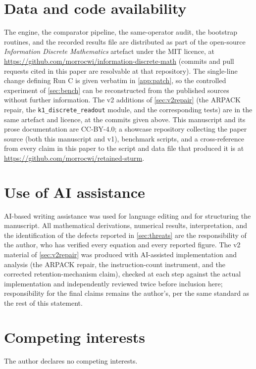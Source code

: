 \documentclass[twocolumn,10pt,a4paper]{article}
\theoremstyle{plain}
\theoremstyle{definition}
\begin{document}
\section*{Data and code availability}
\begin{sloppypar}
The engine, the comparator pipeline, the same-operator
audit, the bootstrap routines, and the recorded
results file are distributed as part of the open-source
\emph{Information Discrete Mathematics} artefact under
the MIT licence, at
\url{https://github.com/morrocwi/information-discrete-math} (commits and
pull requests cited in this paper are resolvable at that repository). The
single-line change defining Run C is given verbatim in
\cref{app:patch}, so the controlled experiment of \cref{sec:bench} can be
reconstructed from the published sources without further information. The
v2 additions of \cref{sec:v2repair} (the ARPACK repair, the
\texttt{k1\_discrete\_readout} module, and the corresponding tests) are in
the same artefact and licence, at the commits given above. This manuscript
and its prose documentation are CC-BY-4.0; a showcase repository collecting
the paper source (both this manuscript and v1), benchmark scripts, and a
cross-reference from every claim in this paper to the script and data file
that produced it is at
\url{https://github.com/morrocwi/retained-sturm}.
\end{sloppypar}

\section*{Use of AI assistance}
AI-based writing assistance was used for language editing and for structuring
the manuscript. All mathematical derivations, numerical results, interpretation,
and the identification of the defects reported in \cref{sec:threats} are the
responsibility of the author, who has verified every equation and every reported
figure. The v2 material of \cref{sec:v2repair} was produced with AI-assisted
implementation and analysis (the ARPACK repair, the instruction-count
instrument, and the corrected retention-mechanism claim), checked at each
step against the actual implementation and independently reviewed twice
before inclusion here; responsibility for the final claims remains the
author's, per the same standard as the rest of this statement.

\section*{Competing interests}
The author declares no competing interests.
\end{document}
